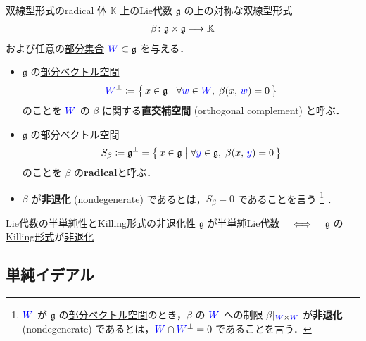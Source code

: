 \documentclass[rep_main]{subfiles}
\begin{document}
\begin{mydef}[label=def:radical-bilinear]{双線型形式のradical}
	体 $\mathbb{K}$ 上のLie代数 $\mathfrak{g}$ の上の対称な双線型形式
	\begin{align}
		\beta \colon \mathfrak{g} \times \mathfrak{g} \longrightarrow \mathbb{K}
	\end{align}
	および任意の\underline{部分集合} $\textcolor{blue}{W} \subset \mathfrak{g}$ を与える．
	\begin{itemize}
		\item $\mathfrak{g}$ の\underline{部分ベクトル空間}
		\begin{align}
			\textcolor{blue}{W}^\perp \coloneqq \bigl\{\, x \in \mathfrak{g} \bigm| \forall \textcolor{blue}{w} \in \textcolor{blue}{W},\; \beta(x,\, \textcolor{blue}{w}) = 0 \,\bigr\} 
		\end{align}
		のことを $\textcolor{blue}{W}$ の $\beta$ に関する\textbf{直交補空間} (orthogonal complement) と呼ぶ．
		\item $\mathfrak{g}$ の部分ベクトル空間
		\begin{align}
			S_\beta \coloneqq \mathfrak{g}^\perp = \bigl\{\, x \in \mathfrak{g} \bigm| \forall \textcolor{blue}{y} \in \mathfrak{g},\; \beta(x,\, \textcolor{blue}{y}) = 0 \,\bigr\} 
		\end{align}
		のことを $\beta$ の\textbf{radical}と呼ぶ．
		\item $\beta$ が\textbf{非退化} (nondegenerate) であるとは，$S_\beta = 0$ であることを言う
		\footnote{$\textcolor{blue}{W}$ が $\mathfrak{g}$ の\underline{部分ベクトル空間}のとき，$\beta$ の $\textcolor{blue}{W}$ への制限 $\beta|_{\textcolor{blue}{W} \times \textcolor{blue}{W}}$ が\textbf{非退化} (nondegenerate) であるとは，$\textcolor{blue}{W} \cap \textcolor{blue}{W}^\perp = 0$ であることを言う．}
		．
	\end{itemize}
	
\end{mydef}

\begin{mytheo}[label=thm:semisimple-LieAlg-iff]{Lie代数の半単純性とKilling形式の非退化性}
	$\mathfrak{g}$ が\hyperref[def:semisimple-LieAlg]{半単純Lie代数}
	$\quad \Longleftrightarrow \quad$ $\mathfrak{g}$ の\hyperref[def:Killing-form]{Killing形式}が\hyperref[def:radical-bilinear]{非退化}
\end{mytheo}


\subsection{単純イデアル}
\end{document}
